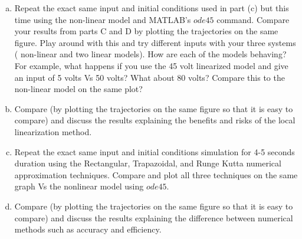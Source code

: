 \documentclass{article}
\begin{document}
\begin{enumerate}[a)]
\item Repeat the exact same input and initial conditions used in part (c) but this time using the non-linear model and MATLAB's $ode45$ command.
Compare your results from parts C and D by plotting the trajectories on the same figure.
Play around with this and try different inputs with your three systems ( non-linear and two linear models).
How are each of the models behaving?
For example, what happens if you use the 45 volt linearized model and give an input of 5 volts Vs 50 volts?
What about 80 volts?
Compare this to the non-linear model on the same plot?
\newline

\item Compare (by plotting the trajectories on the same figure so that it is easy to compare) and discuss the results explaining the benefits and risks of the local linearization method.
\newline

\item Repeat the exact same input and initial conditions simulation for 4-5 seconds duration using the Rectangular, Trapazoidal, and Runge Kutta numerical approximation techniques.
Compare and plot all three techniques on the same graph Vs the nonlinear model using $ode45$.
\newline

\item Compare (by plotting the trajectories on the same figure so that it is easy to compare) and discuss the results explaining the difference between numerical methods such as accuracy and efficiency.
\newline

\end{enumerate}
\end{document}
